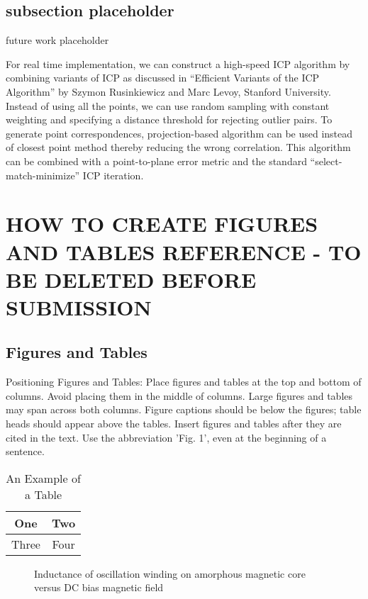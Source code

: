 \documentclass[letterpaper, 10 pt, conference]{ieeeconf}  %
\begin{document}
\subsection{subsection placeholder}

future work placeholder


For real time implementation, we can construct a high-speed ICP algorithm by combining variants of ICP as discussed in “Efficient Variants of the ICP Algorithm” by Szymon Rusinkiewicz and Marc Levoy, Stanford University. Instead of using all the points, we can use random sampling with constant weighting and specifying a distance threshold for rejecting outlier pairs. To generate point correspondences, projection-based algorithm can be used instead of closest point method thereby reducing the wrong correlation. This algorithm can be combined with a point-to-plane error metric and the standard “select-match-minimize” ICP iteration. 


\section{HOW TO CREATE FIGURES AND TABLES REFERENCE - TO BE DELETED BEFORE SUBMISSION}
\subsection{Figures and Tables}

Positioning Figures and Tables: Place figures and tables at the top and bottom of columns. Avoid placing them in the middle of columns. Large figures and tables may span across both columns. Figure captions should be below the figures; table heads should appear above the tables. Insert figures and tables after they are cited in the text. Use the abbreviation 'Fig. 1', even at the beginning of a sentence.

\begin{table}[h]
\caption{An Example of a Table}
\label{table_example}
\begin{center}
\begin{tabular}{|c||c|}
\hline
One & Two\\
\hline
Three & Four\\
\hline
\end{tabular}
\end{center}
\end{table}


   \begin{figure}[thpb]
      \centering
      \caption{Inductance of oscillation winding on amorphous
       magnetic core versus DC bias magnetic field}
      \label{figurelabel}
   \end{figure}
   
\end{document}
